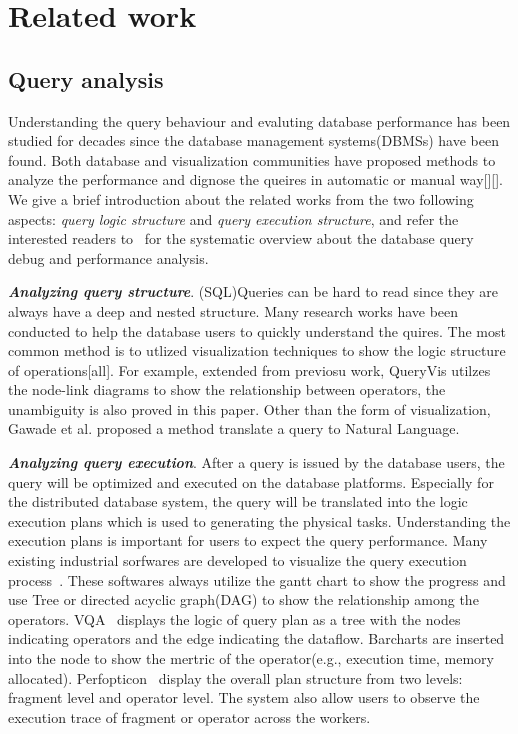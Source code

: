 \section{Related work}
\subsection{Query analysis}
Understanding the query behaviour and evaluting database performance has been studied for decades since the database management systems(DBMSs) have been found. Both database and visualization communities have proposed methods to analyze the performance and dignose the queires in automatic or manual way[][]. We give a brief introduction about the related works from the two following aspects: \textit{query logic structure} and \textit{query execution structure}, and refer the interested readers to~\cite{gathani2020debugging} for the systematic overview about the database query debug and performance analysis.

\emph{\textbf{Analyzing query structure}}. (SQL)Queries can be hard to read since they are always have a deep and nested structure. Many research works have been conducted to help the database users to quickly understand the quires. The most common method is to utlized visualization techniques to show the logic structure of operations[all]. For example, extended from previosu work, QueryVis utilzes the node-link diagrams to show the relationship between operators, the unambiguity is also proved in this paper. Other than the form of visualization, Gawade et al. proposed a method translate a query to Natural Language.  

\emph{\textbf{Analyzing query execution}}. 
After a query is issued by the database users, the query will be optimized and executed on the database platforms. Especially for the distributed database system, the query will be translated into the logic execution plans which is used to generating the physical tasks. Understanding the execution plans is important for users to expect the query performance. Many existing industrial sorfwares are developed to visualize the query execution process~\cite{tez-ui}. These softwares always utilize the gantt chart to show the progress and use Tree or directed acyclic graph(DAG) to show the relationship among the operators. VQA~\cite{simitsis2014vqa} displays the logic of query plan as a tree with the nodes indicating operators and the edge indicating the dataflow. Barcharts are inserted into the node to show the mertric of the operator(e.g., execution time, memory allocated). Perfopticon~\cite{moritz2015perfopticon} display the overall plan structure from two levels: fragment level and operator level. The system also allow users to observe the execution trace of fragment or operator across the workers.


